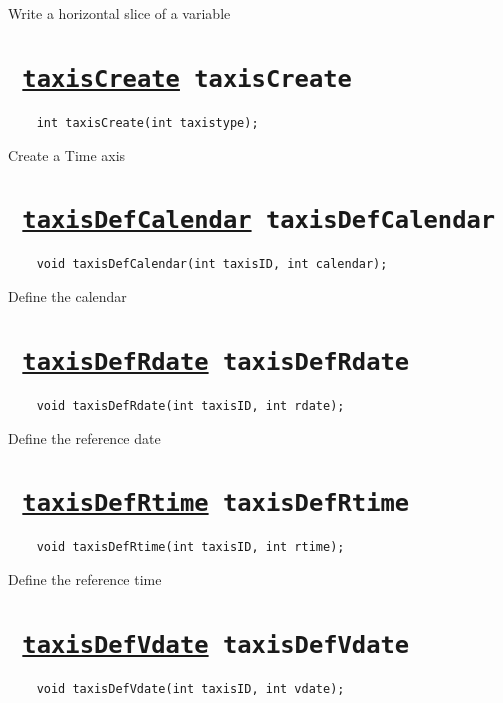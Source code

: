 Write a horizontal slice of a variable
\ifpdfoutput{}{(\ref{streamWriteVarSliceF})}


\section*{\texttt{ 
\ifpdf
\hyperref[taxisCreate]{taxisCreate}
\else
taxisCreate
\fi
}}
\begin{verbatim}
    int taxisCreate(int taxistype);
\end{verbatim}

Create a Time axis
\ifpdfoutput{}{(\ref{taxisCreate})}


\section*{\texttt{ 
\ifpdf
\hyperref[taxisDefCalendar]{taxisDefCalendar}
\else
taxisDefCalendar
\fi
}}
\begin{verbatim}
    void taxisDefCalendar(int taxisID, int calendar);
\end{verbatim}

Define the calendar
\ifpdfoutput{}{(\ref{taxisDefCalendar})}


\section*{\texttt{ 
\ifpdf
\hyperref[taxisDefRdate]{taxisDefRdate}
\else
taxisDefRdate
\fi
}}
\begin{verbatim}
    void taxisDefRdate(int taxisID, int rdate);
\end{verbatim}

Define the reference date
\ifpdfoutput{}{(\ref{taxisDefRdate})}


\section*{\texttt{ 
\ifpdf
\hyperref[taxisDefRtime]{taxisDefRtime}
\else
taxisDefRtime
\fi
}}
\begin{verbatim}
    void taxisDefRtime(int taxisID, int rtime);
\end{verbatim}

Define the reference time
\ifpdfoutput{}{(\ref{taxisDefRtime})}


\section*{\texttt{ 
\ifpdf
\hyperref[taxisDefVdate]{taxisDefVdate}
\else
taxisDefVdate
\fi
}}
\begin{verbatim}
    void taxisDefVdate(int taxisID, int vdate);
\end{verbatim}

